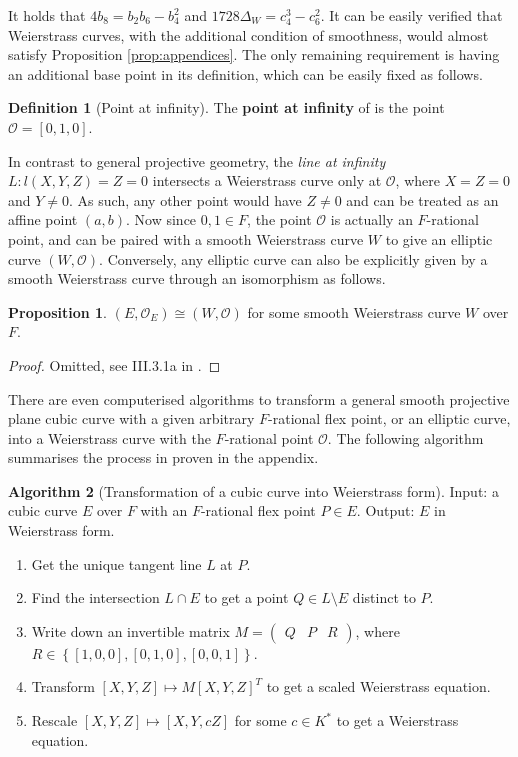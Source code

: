 \documentclass{article}
\newcommand{\rb}[1]{\left( #1 \right)}
\renewcommand{\sb}[1]{\left[ #1 \right]}
\newcommand{\cb}[1]{\left\{ #1 \right\}}
\theoremstyle{definition}\newtheorem*{definition}{Definition}
\theoremstyle{definition}\newtheorem*{example}{Example}
\theoremstyle{definition}\newtheorem*{remark}{Remark}
\newtheorem{proposition}{Proposition}[subsection]
\newtheorem{algorithm}[proposition]{Algorithm}
\begin{document}
It holds that $ 4b_8 = b_2b_6 - b_4^2 $ and $ 1728\Delta_W = c_4^3 - c_6^2 $. It can be easily verified that Weierstrass curves, with the additional condition of smoothness, would almost satisfy Proposition \ref{prop:appendices}. The only remaining requirement is having an additional base point in its definition, which can be easily fixed as follows.

\begin{definition}[Point at infinity]
The \textbf{point at infinity} of is the point $ \mathcal{O} = \sb{0, 1, 0} $.
\end{definition}

In contrast to general projective geometry, the \emph{line at infinity} $ L : l\rb{X, Y, Z} = Z = 0 $ intersects a Weierstrass curve only at $ \mathcal{O} $, where $ X = Z = 0 $ and $ Y \ne 0 $. As such, any other point would have $ Z \ne 0 $ and can be treated as an affine point $ \rb{a, b} $. Now since $ 0, 1 \in F $, the point $ \mathcal{O} $ is actually an $ F $-rational point, and can be paired with a smooth Weierstrass curve $ W $ to give an elliptic curve $ \rb{W, \mathcal{O}} $. Conversely, any elliptic curve can also be explicitly given by a smooth Weierstrass curve through an isomorphism as follows.

\begin{proposition}
$ \rb{E, \mathcal{O}_E} \cong \rb{W, \mathcal{O}} $ for some smooth Weierstrass curve $ W $ over $ F $.
\end{proposition}

\begin{proof}
Omitted, see III.3.1a in \cite{gtm}.
\end{proof}

There are even computerised algorithms to transform a general smooth projective plane cubic curve with a given arbitrary $ F $-rational flex point, or an elliptic curve, into a Weierstrass curve with the $ F $-rational point $ \mathcal{O} $. The following algorithm summarises the process in \cite{weierstrass} proven in the appendix.

\begin{algorithm}[Transformation of a cubic curve into Weierstrass form]
Input: a cubic curve $ E $ over $ F $ with an $ F $-rational flex point $ P \in E $. Output: $ E $ in Weierstrass form.
\begin{enumerate}
\item Get the unique tangent line $ L $ at $ P $.
\item Find the intersection $ L \cap E $ to get a point $ Q \in L \setminus E $ distinct to $ P $.
\item Write down an invertible matrix $ M = \begin{pmatrix} Q & P & R \end{pmatrix} $, where $ R \in \cb{\sb{1, 0, 0}, \sb{0, 1, 0}, \sb{0, 0, 1}} $.
\item Transform $ \sb{X, Y, Z} \mapsto M\sb{X, Y, Z}^T $ to get a scaled Weierstrass equation.
\item Rescale $ \sb{X, Y, Z} \mapsto \sb{X, Y, cZ} $ for some $ c \in K^* $ to get a Weierstrass equation.
\end{enumerate}
\end{algorithm}
\end{document}
